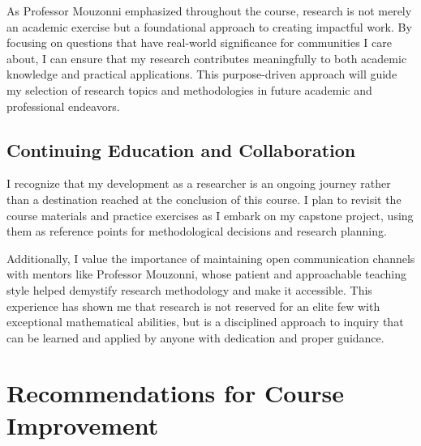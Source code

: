 \documentclass[
]{article}
\begin{document}
As Professor Mouzonni emphasized throughout the course, research is not
merely an academic exercise but a foundational approach to creating
impactful work. By focusing on questions that have real-world
significance for communities I care about, I can ensure that my research
contributes meaningfully to both academic knowledge and practical
applications. This purpose-driven approach will guide my selection of
research topics and methodologies in future academic and professional
endeavors.

\subsection{Continuing Education and
Collaboration}\label{continuing-education-and-collaboration}

I recognize that my development as a researcher is an ongoing journey
rather than a destination reached at the conclusion of this course. I
plan to revisit the course materials and practice exercises as I embark
on my capstone project, using them as reference points for
methodological decisions and research planning.

Additionally, I value the importance of maintaining open communication
channels with mentors like Professor Mouzonni, whose patient and
approachable teaching style helped demystify research methodology and
make it accessible. This experience has shown me that research is not
reserved for an elite few with exceptional mathematical abilities, but
is a disciplined approach to inquiry that can be learned and applied by
anyone with dedication and proper guidance.

\section{Recommendations for Course
Improvement}\label{recommendations-for-course-improvement}
\end{document}
